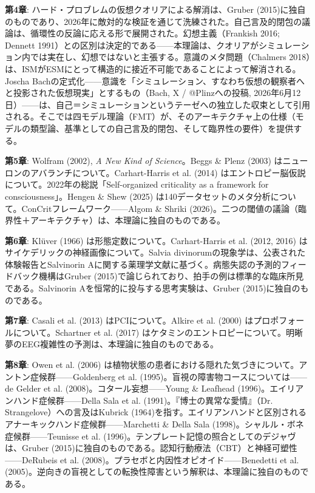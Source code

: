 \documentclass[11pt, twoside, openright]{book}
\begin{document}
\textbf{第4章}: ハード・プロブレムの仮想クオリアによる解消は、Gruber (2015)に独自のものであり、2026年に敵対的な検証を通じて洗練された。自己言及的閉包の議論は、循環性の反論に応える形で展開された。幻想主義（Frankish 2016; Dennett 1991）との区別は決定的である------本理論は、クオリアがシミュレーション内では実在し、幻想ではないと主張する。意識のメタ問題（Chalmers 2018）は、ISMがESMにとって構造的に接近不可能であることによって解消される。Joscha Bachの定式化------意識を「シミュレーション、すなわち仮想の観察者へと投影された仮想現実」とするもの（Bach, X / @Plinzへの投稿, 2026年6月12日）------は、自己＝シミュレーションというテーゼへの独立した収束として引用される。そこでは四モデル理論（FMT）が、そのアーキテクチャ上の仕様（モデルの類型論、基準としての自己言及的閉包、そして臨界性の要件）を提供する。

\textbf{第5章}: Wolfram (2002), \textit{A New Kind of Science}。Beggs \& Plenz (2003) はニューロンのアバランチについて。Carhart-Harris et al. (2014) はエントロピー脳仮説について。2022年の総説「Self-organized criticality as a framework for consciousness」。Hengen \& Shew (2025) は140データセットのメタ分析について。ConCritフレームワーク------Algom \& Shriki (2026)。二つの閾値の議論（臨界性＋アーキテクチャ）は、本理論に独自のものである。

\textbf{第6章}: Klüver (1966) は形態定数について。Carhart-Harris et al. (2012, 2016) はサイケデリックの神経画像について。Salvia divinorumの現象学は、公表された体験報告とSalvinorin Aに関する薬理学文献に基づく。病態失認の予測的フィードバック機構はGruber (2015)で論じられており、拍手の例は標準的な臨床所見である。Salvinorin Aを恒常的に投与する思考実験は、Gruber (2015)に独自のものである。

\textbf{第7章}: Casali et al. (2013) はPCIについて。Alkire et al. (2000) はプロポフォールについて。Schartner et al. (2017) はケタミンのエントロピーについて。明晰夢のEEG複雑性の予測は、本理論に独自のものである。

\textbf{第8章}: Owen et al. (2006) は植物状態の患者における隠れた気づきについて。アントン症候群------Goldenberg et al. (1995)。盲視の障害物コースについては------de Gelder et al. (2008)。コタール妄想------Young \& Leafhead (1996)。エイリアンハンド症候群------Della Sala et al. (1991)。『博士の異常な愛情』（Dr. Strangelove）への言及はKubrick (1964)を指す。エイリアンハンドと区別されるアナーキックハンド症候群------Marchetti \& Della Sala (1998)。シャルル・ボネ症候群------Teunisse et al. (1996)。テンプレート記憶の照合としてのデジャヴは、Gruber (2015)に独自のものである。認知行動療法（CBT）と神経可塑性------DeRubeis et al. (2008)。プラセボと内因性オピオイド------Benedetti et al. (2005)。逆向きの盲視としての転換性障害という解釈は、本理論に独自のものである。
\end{document}
